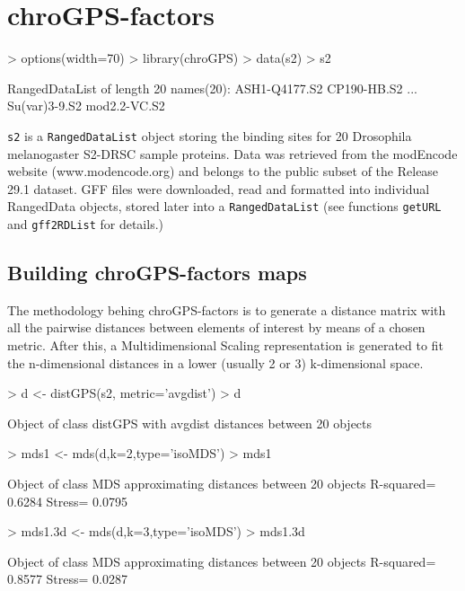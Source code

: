\documentclass[a4paper,12pt,nogin]{article}
\begin{document}
\section{chroGPS-factors}
\label{sec:chrogps_factors}

\footnotesize

\begin{Schunk}
\begin{Sinput}
> options(width=70)
> library(chroGPS)
> data(s2)
> s2
\end{Sinput}
\begin{Soutput}
RangedDataList of length 20
names(20): ASH1-Q4177.S2 CP190-HB.S2 ... Su(var)3-9.S2 mod2.2-VC.S2
\end{Soutput}
\end{Schunk}

\normalsize

\texttt{s2} is a \texttt{RangedDataList} object storing the
binding sites for 20 Drosophila melanogaster S2-DRSC sample
proteins. Data was retrieved from the modEncode website
(www.modencode.org) and belongs to the public subset of the Release 29.1 dataset. GFF files
were downloaded, read and formatted into individual RangedData
objects, stored later into a \texttt{RangedDataList} (see functions \texttt{getURL} and 
\texttt{gff2RDList} for details.)
 
 
\subsection{Building chroGPS-factors maps}
\label{ssec:factormaps}
 
The methodology behing chroGPS-factors is to generate a distance
matrix with all the pairwise distances between elements of interest by
means of a chosen metric. After this, a Multidimensional Scaling
representation is generated to fit the n-dimensional distances in a
lower (usually 2 or 3) k-dimensional space.
 
\footnotesize
 
\begin{Schunk}
\begin{Sinput}
> d <- distGPS(s2, metric='avgdist')
> d
\end{Sinput}
\begin{Soutput}
Object of class distGPS with avgdist distances between 20 objects 
\end{Soutput}
\begin{Sinput}
> mds1 <- mds(d,k=2,type='isoMDS')
> mds1
\end{Sinput}
\begin{Soutput}
Object of class MDS approximating distances between 20 objects 
R-squared= 0.6284 Stress= 0.0795 
\end{Soutput}
\begin{Sinput}
> mds1.3d <- mds(d,k=3,type='isoMDS')
> mds1.3d
\end{Sinput}
\begin{Soutput}
Object of class MDS approximating distances between 20 objects 
R-squared= 0.8577 Stress= 0.0287 
\end{Soutput}
\end{Schunk}
 
\end{document}
